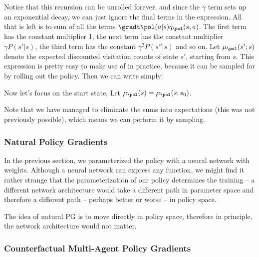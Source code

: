\documentclass[12pt]{article}
\begin{document}
Notice that this recursion can be unrolled forever, and since the $\gamma$ term sets up an exponential decay, we can just ignore the final terms in the expression. All that is left is to sum of all the terms $\gradt \pol(a|s) q_{\pol}(s, a)$. The first term has the constant multiplier 1, the next term has the constant multiplier $\gamma P(s'|s)$, the third term has the constant $\gamma^2 P(s''|s)$ and so on. Let $\mu_{\pol}(s';s)$ denote the expected discounted visitation counts of state $s'$, starting from $s$. This expression is pretty easy to make use of in practice, because it can be sampled for by rolling out the policy. Then we can write simply:


Now let's focus on the start state, Let $\mu_{\pol}(s) = \mu_{\pol}(s;s_0)$.


Note that we have managed to eliminate the sums into expectations (this was not previously possible), which means we can perform it by sampling.

\subsubsection{Natural Policy Gradients}

In the previous section, we parameterized the policy with a neural network with weights. Although a neural network can express any function, we might find it rather strange that the parameterization of our policy determines the training -- a different network architecture would take a different path in parameter space and therefore a different path -- perhaps better or worse -- in policy space. 

The idea of natural PG is to move directly in policy space, therefore in principle, the network architecture would not matter. 


\subsubsection{Counterfactual Multi-Agent Policy Gradients}
\end{document}
